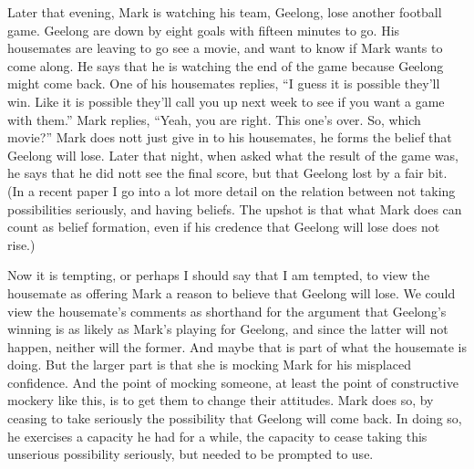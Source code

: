 Later that evening, Mark is watching his team, Geelong, lose another football game. Geelong are down by eight goals with fifteen minutes to go. His housemates are leaving to go see a movie, and want to know if Mark wants to come along. He says that he is watching the end of the game because Geelong might come back. One of his housemates replies, ``I guess it is possible they'll win. Like it is possible they'll call you up next week to see if you want a game with them.'' Mark replies, ``Yeah, you are right. This one's over. So, which movie?'' Mark does nott just give in to his housemates, he forms the belief that Geelong will lose. Later that night, when asked what the result of the game was, he says that he did nott see the final score, but that Geelong lost by a fair bit. (In a recent paper \citep{Weatherson2005-WEACWD} I go into a lot more detail on the relation between not taking possibilities seriously, and having beliefs. The upshot is that what Mark does can count as belief formation, even if his credence that Geelong will lose does not rise.)

Now it is tempting, or perhaps I should say that I am tempted, to view the housemate as offering Mark a reason to believe that Geelong will lose. We could view the housemate's comments as shorthand for the argument that Geelong's winning is as likely as Mark's playing for Geelong, and since the latter will not happen, neither will the former. And maybe that is part of what the housemate is doing. But the larger part is that she is mocking Mark for his misplaced confidence. And the point of mocking someone, at least the point of constructive mockery like this, is to get them to change their attitudes. Mark does so, by ceasing to take seriously the possibility that Geelong will come back. In doing so, he exercises a capacity he had for a while, the capacity to cease taking this unserious possibility seriously, but needed to be prompted to use.

